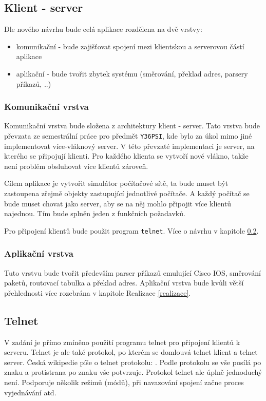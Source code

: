 
\subsection{Klient - server}\label{klient_server}
Dle nového návrhu bude celá aplikace rozdělena na dvě vrstvy:
\begin{itemize}
 \item komunikační - bude zajišťovat spojení mezi klientskou a serverovou částí aplikace
 \item aplikační - bude tvořit zbytek systému (směrování, překlad adres, parsery příkazů, ..)
\end{itemize}

\subsubsection{Komunikační vrstva}
Komunikační vrstva bude složena z architektury klient - server. Tato vrstva bude převzata ze semestrální práce pro předmět \verb|Y36PSI|, kde bylo za úkol mimo jiné implementovat více-vláknový server. V této převzaté implementaci je server, na kterého se připojují klienti. Pro každého klienta se vytvoří nové vlákno, takže není problém obsluhovat více klientů zároveň. 

Cílem aplikace je vytvořit simulátor počítačové sítě, ta bude muset být zastoupena zřejmě objekty zastupující jednotlivé počítače. A každý počítač se bude muset chovat jako server, aby se na něj mohlo připojit více klientů najednou. Tím bude splněn jeden z funkčních požadavků.

Pro připojení klientů bude použit program \verb|telnet|. Více o návrhu v kapitole \ref{telnet}. 


\subsubsection{Aplikační vrstva}
Tuto vrstvu bude tvořit především parser příkazů emulující Cisco IOS, směrování paketů, routovací tabulka a překlad adres. Aplikační vrstva bude kvůli větší přehlednosti více rozebrána v kapitole Realizace \ref{realizace}.


\subsection{Telnet} \label{telnet}
V zadání je přímo zmíněno použití programu telnet pro připojení klientů k serveru. Telnet je ale také protokol, po kterém se domlouvá telnet klient a telnet server. Česká wikipedie píše o telnet protokolu: . Podle protokolu se vše posílá po znaku a protistrana po znaku vše potvrzuje. Protokol telnet ale úplně jednoduchý není. Podporuje několik režimů (módů), při navazování spojení začne proces vyjednávání atd. 

